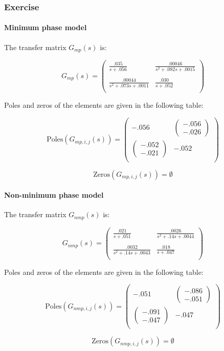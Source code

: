 \subsubsection{Exercise}
\paragraph{Minimum phase model}

The transfer matrix $G_{mp}(s)$ is:

$$G_{mp}(s) = \left(\begin{array}{cc} 
    \frac{.035}{s + .056} & \frac{.00046}{s^2 + .082 s + .0015} \\
    \\
    \frac{ .00044}{  s^2 + .073 s + .0011} & \frac{.030}{s + .052} \\
\end{array}\right)$$


Poles and zeros of the elements are given in the following table:

$$
\text{Poles}(G_{mp,i,j}(s)) = \left(\begin{array}{cc} -.056 & \left(\begin{array}{c} -.056\\ -.026 \end{array}\right) \\ \left(\begin{array}{c} -.052\\ -.021 \end{array}\right) & -.052 \\ \end{array}\right)
$$

$$\text{Zeros}(G_{mp,i,j}(s)) = \emptyset $$

\paragraph{Non-minimum phase model}

The transfer matrix $G_{nmp}(s)$ is:

$$G_{nmp}(s) = \left(\begin{array}{cc} 
    \frac{.021}{s + .051} & \frac{.0026}{s^2 + .14 s + .0044} \\
    \\
    \frac{ .0032}{ s^2 + .14 s + .0043} & \frac{.018}{s + .047} \\
\end{array}\right)$$

Poles and zeros of the elements are given in the following table:


$$\text{Poles}(G_{nmp,i,j}(s)) = 
\left(\begin{array}{cc} -.051 & \left(\begin{array}{c} -.086\\ -.051 \end{array}\right) \\ \left(\begin{array}{c} -.091\\ -.047 \end{array}\right) & -.047 \\ \end{array}\right)
$$

$$\text{Zeros}(G_{nmp,i,j}(s)) = \emptyset $$
